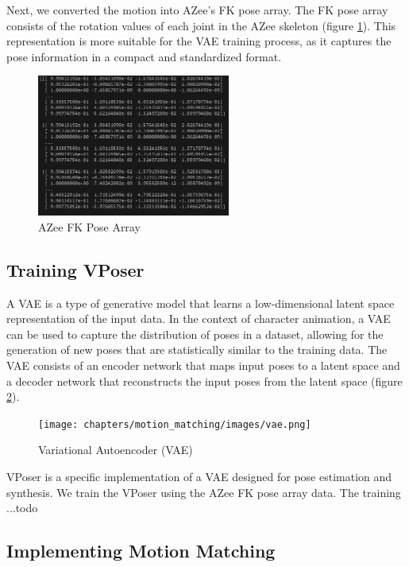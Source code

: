 \documentclass[../../main.tex]{subfiles}
\begin{document}
Next, we converted the motion into AZee's FK pose array. The FK pose array consists of the rotation values of each joint in the AZee skeleton (figure \ref{fig:azee_fk_pose}). This representation is more suitable for the VAE training process, as it captures the pose information in a compact and standardized format.

\begin{figure}
  \centering \includegraphics[width = 2.5in]{chapters/motion_matching/images/azee_fk_pose.png}
  \caption{AZee FK Pose Array}
  \label{fig:azee_fk_pose}
\end{figure}

\subsection{Training VPoser}
\label{ch:motion_matching:motion_matching_with_azee:training}

A VAE \cite{todo} is a type of generative model that learns a low-dimensional latent space representation of the input data. In the context of character animation, a VAE can be used to capture the distribution of poses in a dataset, allowing for the generation of new poses that are statistically similar to the training data. The VAE consists of an encoder network that maps input poses to a latent space and a decoder network that reconstructs the input poses from the latent space (figure \ref{fig:vae}).

\begin{figure}
  \centering \texttt{[image: chapters/motion\_matching/images/vae.png]}
  \caption{Variational Autoencoder (VAE)}
  \label{fig:vae}
\end{figure}

VPoser is a specific implementation of a VAE designed for pose estimation and synthesis. We train the VPoser using the AZee FK pose array data. The training ...todo

\subsection{Implementing Motion Matching}
\label{ch:motion_matching:motion_matching_with_azee:implementation}
\end{document}
